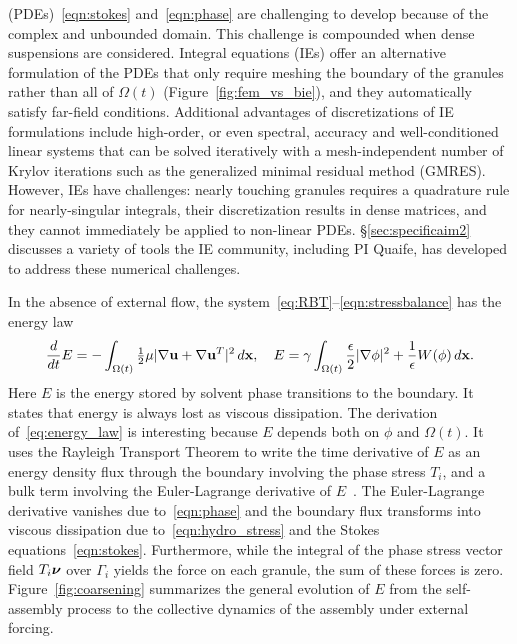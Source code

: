 (PDEs)~\eqref{eqn:stokes} and~\eqref{eqn:phase} are challenging to
develop because of the complex and unbounded domain. This challenge
is compounded when dense suspensions are considered.
Integral equations
(IEs) offer an alternative formulation of the PDEs that only require
meshing the boundary of the granules rather than all of $\Omega(t)$
(Figure~\ref{fig:fem_vs_bie}), and they automatically satisfy far-field
conditions. Additional advantages of discretizations of IE formulations
include high-order, or even spectral, accuracy and well-conditioned
linear systems that can be solved iteratively with a mesh-independent
number of Krylov iterations such as the generalized minimal residual
method (GMRES). However, IEs have challenges: nearly touching granules
requires a quadrature rule for nearly-singular integrals, their
discretization results in dense matrices, and they cannot immediately be
applied to non-linear PDEs. \S\ref{sec:specificaim2} discusses a variety
of tools the IE community, including PI Quaife, has developed to address
these numerical challenges.

In the absence of external flow, the
system~\eqref{eq:RBT}--\eqref{eqn:stressbalance} has the energy law
\begin{align}
\label{eq:energy_law}
  \frac{d}{dt}E
  = - \int_{\Omega(t)}\tfrac{1}{2}\mu|\nabla \mathbf{u} + \nabla
  \mathbf{u}^T|^2 \,d\mathbf{x},\quad
    E = \gamma \int_{\Omega(t)}
  \frac{\epsilon}{2} |\nabla \phi|^2 + \frac{1}{\epsilon} W(\phi) \,d\mathbf{x}.
\end{align}
Here $E$ is the energy stored by solvent phase transitions to the
boundary. It states that energy is always lost as viscous
dissipation. The derivation of~\eqref{eq:energy_law} is interesting
because $E$ depends both on $\phi$ and $\Omega(t)$. It uses the Rayleigh
Transport Theorem to write the time derivative of $E$ as an energy
density flux through the boundary involving the phase stress $T_i$, and
a bulk term involving the Euler-Lagrange derivative of
$E$~\cite{Fu2018_SIAM}. The Euler-Lagrange derivative vanishes due
to~\eqref{eqn:phase} and the boundary flux transforms into viscous
dissipation due to~\eqref{eqn:hydro_stress} and the Stokes
equations~\eqref{eqn:stokes}.
Furthermore, while the integral of the phase stress vector
field $T_i\boldsymbol{\nu}$ over $\Gamma_i$ yields the force on
each granule, the sum of these forces is zero. 
Figure~\ref{fig:coarsening} summarizes the
general evolution of $E$ from the self-assembly process to the
collective dynamics of the assembly under external forcing.


